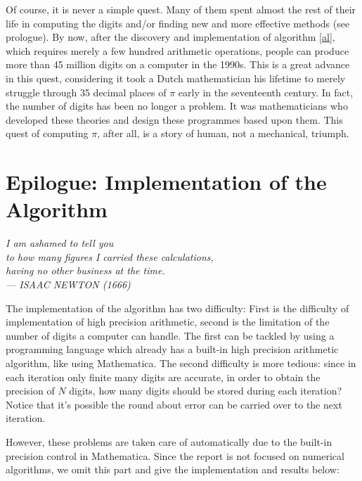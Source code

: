 \documentclass{report}
\begin{document}
\begin{titlepage}
Of course, it is never a simple quest. Many of them spent almost the rest of their life in computing the digits and/or finding new and more effective methods (see prologue). By now, after the discovery  and implementation of algorithm \ref{al}, which requires merely a few hundred arithmetic operations, people can produce more than 45 million digits on a computer in the 1990s. This is a great advance in this quest, considering it took a Dutch mathematician his lifetime to merely struggle through 35 decimal places of $\pi$ early in the seventeenth century\cite{Knuth:1997aa}. In fact, the number of digits has been no longer a problem. It was mathematicians who developed these theories and design these programmes based upon them. This quest of computing $\pi$, after all, is a story of human, not a mechanical, triumph\cite{Dunham:1990aa}.

\eject






\chapter{Epilogue: Implementation of the Algorithm}
{\flushright
	{\sffamily\slshape
		I am ashamed to tell you\\ 
		to how many figures I carried these calculations,\\ 
		having no other business at the time.\smallskip\\
		{\sffamily\upshape --- ISAAC NEWTON (1666)}
	}	

}


\vskip 1in
The implementation of the algorithm has two difficulty: First is the difficulty of implementation of high precision arithmetic, second is the limitation of the number of digits a computer can handle. The first can be tackled by using a programming language which already has a built-in high precision arithmetic algorithm, like using Mathematica\texttrademark. The second difficulty is more tedious: since in each iteration only finite many digits are accurate, in order to obtain the precision of $N$ digits, how many digits should be stored during each iteration? Notice that it's possible the round about error can be carried over to the next iteration.

However, these problems are taken care of automatically due to the built-in precision control in Mathematica\texttrademark. Since the report is not focused on numerical algorithms, we omit this part and give the implementation and results below:


\end{titlepage}
\end{document}
